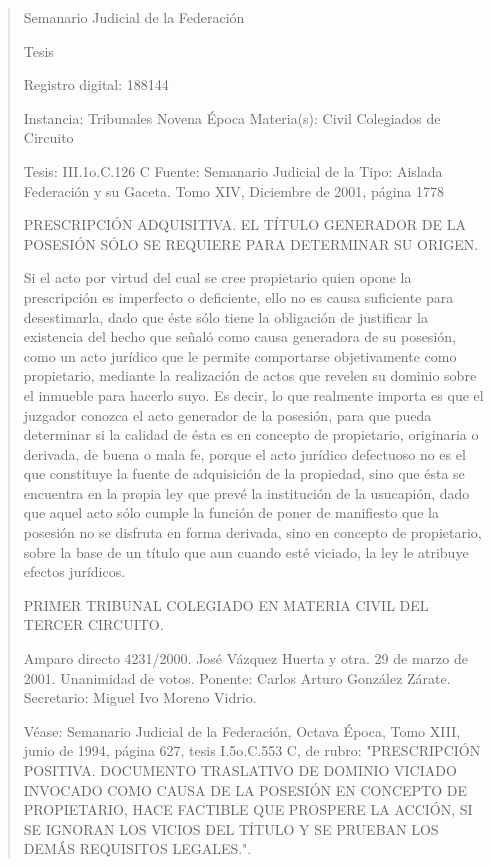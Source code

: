 \documentclass[11pt,a4paper]{article}
\begin{document}
\begin{quote}
                                                   Semanario Judicial de la Federación

                                                  Tesis

 Registro digital: 188144

 Instancia: Tribunales            Novena Época                          Materia(s): Civil
 Colegiados de Circuito

 Tesis: III.1o.C.126 C            Fuente: Semanario Judicial de la      Tipo: Aislada
                                  Federación y su Gaceta.
                                  Tomo XIV, Diciembre de 2001,
                                  página 1778


PRESCRIPCIÓN ADQUISITIVA. EL TÍTULO GENERADOR DE LA POSESIÓN SÓLO SE
REQUIERE PARA DETERMINAR SU ORIGEN.


Si el acto por virtud del cual se cree propietario quien opone la prescripción es imperfecto o
deficiente, ello no es causa suficiente para desestimarla, dado que éste sólo tiene la obligación de
justificar la existencia del hecho que señaló como causa generadora de su posesión, como un acto
jurídico que le permite comportarse objetivamente como propietario, mediante la realización de
actos que revelen su dominio sobre el inmueble para hacerlo suyo. Es decir, lo que realmente
importa es que el juzgador conozca el acto generador de la posesión, para que pueda determinar si
la calidad de ésta es en concepto de propietario, originaria o derivada, de buena o mala fe, porque
el acto jurídico defectuoso no es el que constituye la fuente de adquisición de la propiedad, sino que
ésta se encuentra en la propia ley que prevé la institución de la usucapión, dado que aquel acto sólo
cumple la función de poner de manifiesto que la posesión no se disfruta en forma derivada, sino en
concepto de propietario, sobre la base de un título que aun cuando esté viciado, la ley le atribuye
efectos jurídicos.

PRIMER TRIBUNAL COLEGIADO EN MATERIA CIVIL DEL TERCER CIRCUITO.


Amparo directo 4231/2000. José Vázquez Huerta y otra. 29 de marzo de 2001. Unanimidad de
votos. Ponente: Carlos Arturo González Zárate. Secretario: Miguel Ivo Moreno Vidrio.

Véase: Semanario Judicial de la Federación, Octava Época, Tomo XIII, junio de 1994, página 627,
tesis I.5o.C.553 C, de rubro: "PRESCRIPCIÓN POSITIVA. DOCUMENTO TRASLATIVO DE
DOMINIO VICIADO INVOCADO COMO CAUSA DE LA POSESIÓN EN CONCEPTO DE
PROPIETARIO, HACE FACTIBLE QUE PROSPERE LA ACCIÓN, SI SE IGNORAN LOS VICIOS
DEL TÍTULO Y SE PRUEBAN LOS DEMÁS REQUISITOS LEGALES.".


\end{quote}
\end{document}
